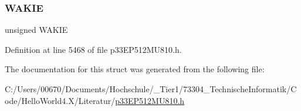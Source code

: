 \subsubsection{\texorpdfstring{W\+A\+K\+IE}{WAKIE}}
{\footnotesize\ttfamily unsigned W\+A\+K\+IE}



Definition at line 5468 of file p33\+E\+P512\+M\+U810.\+h.



The documentation for this struct was generated from the following file\+:\begin{DoxyCompactItemize}
\item 
C\+:/\+Users/00670/\+Documents/\+Hochschule/\+\_\+\+Tier1/73304\+\_\+\+Technische\+Informatik/\+Code/\+Hello\+World4.\+X/\+Literatur/\hyperlink{p33_e_p512_m_u810_8h}{p33\+E\+P512\+M\+U810.\+h}\end{DoxyCompactItemize}
